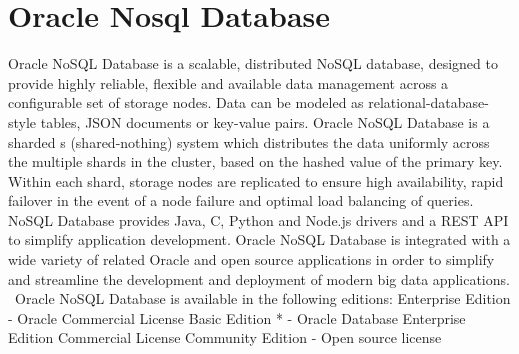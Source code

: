 \section{Oracle Nosql Database}

Oracle NoSQL Database\cite{hid-sp18-515-www-oraclenosql} is a 
scalable, distributed NoSQL database, designed to provide highly 
reliable, flexible and available data management across a 
configurable set of storage nodes.
Data can be modeled as relational-database-style tables, JSON 
documents or key-value pairs. Oracle NoSQL Database is a sharded 
s (shared-nothing) system which distributes the data uniformly across 
the multiple shards in the cluster, based on the hashed value of the 
primary key. Within each shard, storage nodes are replicated to ensure 
high availability, rapid failover in the event of a node failure and 
optimal load balancing of queries. NoSQL Database provides Java, C, 
Python and Node.js drivers and a REST API to simplify application 
development. Oracle NoSQL Database is integrated with a wide variety 
of related Oracle and open source applications in order to simplify 
and streamline the development and deployment of modern big data 
applications.  Oracle NoSQL Database is available in the following 
editions: 
Enterprise Edition - Oracle Commercial License
Basic Edition * - Oracle Database Enterprise Edition Commercial 
License
Community Edition - Open source license 
